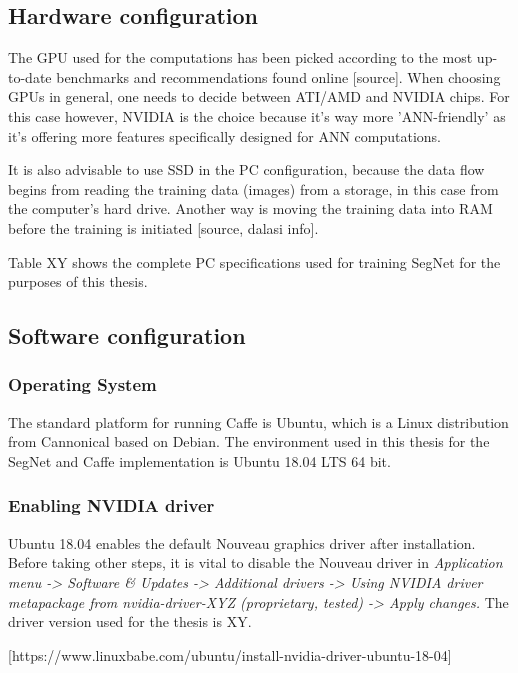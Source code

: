 \subsection{Hardware configuration}

The GPU used for the computations has been picked according to the most up-to-date benchmarks and recommendations found online [source]. When choosing GPUs in general, one needs to decide between ATI/AMD and NVIDIA chips. For this case however, NVIDIA is the choice because it's way more 'ANN-friendly' as it's offering more features specifically designed for ANN computations. 

It is also advisable to use SSD in the PC configuration, because the data flow begins from reading the training data (images) from a storage, in this case from the computer's hard drive. Another way is moving the training data into RAM before the training is initiated [source, dalasi info]. 

Table XY shows the complete PC specifications used for training SegNet for the purposes of this thesis.  

\subsection{Software configuration} 

\subsubsection{Operating System} 

The standard platform for running Caffe is Ubuntu, which is a Linux distribution from Cannonical based on Debian. The environment used in this thesis for the SegNet and Caffe implementation is Ubuntu 18.04 LTS 64 bit.

\subsubsection{Enabling NVIDIA driver}

Ubuntu 18.04 enables the default Nouveau graphics driver after installation. Before taking other steps, it is vital to disable the Nouveau driver in \textit{Application menu -> Software \& Updates -> Additional drivers
	-> Using NVIDIA driver metapackage from nvidia-driver-XYZ (proprietary, tested) -> Apply changes.} The driver version used for the thesis is XY.

[https://www.linuxbabe.com/ubuntu/install-nvidia-driver-ubuntu-18-04]

